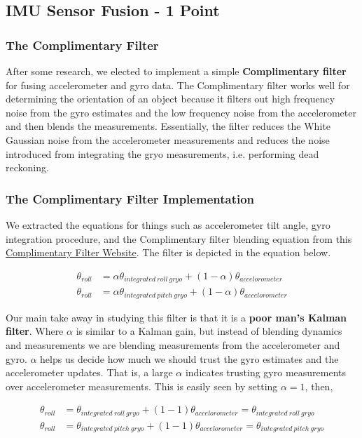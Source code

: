 \documentclass{article}
\numberwithin{equation}{section} %
\numberwithin{figure}{section} %
\numberwithin{table}{section} %
\begin{document}
\begin{framed}
\subsection{IMU Sensor Fusion - 1 Point}
\label{sec:SensorFusion}
\subsubsection{The Complimentary Filter}
After some research, we elected to implement a simple \textbf{Complimentary filter} for fusing accelerometer and gyro data. The Complimentary filter works well for determining the orientation of an object because it filters out high frequency noise from the gyro estimates and the low frequency noise from the accelerometer and then blends the measurements.  Essentially, the filter reduces the White Gaussian noise from the accelerometer measurements and reduces the noise introduced from integrating the gryo measurements, i.e. performing dead reckoning.
\subsubsection{The Complimentary Filter Implementation}

We extracted the equations for things such as accelerometer tilt angle, gyro integration procedure, and the Complimentary filter blending equation from this \href{https://ahrs.readthedocs.io/en/latest/filters/complementary.html}{Complimentary Filter Website}.  The filter is depicted in the equation below.

\begin{align*}
    \theta_{roll} &= \alpha\theta_{integrated \ roll \ gryo } + (1-\alpha)\theta_{accelorometer} \\
    \theta_{roll} &= \alpha\theta_{integrated \ pitch \ gryo } + (1-\alpha)\theta_{accelorometer}
\end{align*}

Our main take away in studying this filter is that it is a \textbf{poor man's Kalman filter}.  Where $\alpha$ is similar to a Kalman gain, but instead of blending dynamics and measurements we are blending measurements from the accelerometer and gyro.  $\alpha$ helps us decide how much we should trust the gyro estimates and the accelerometer updates.  That is, a large $\alpha$ indicates trusting gyro measurements over accelerometer measurements.  This is easily seen by setting $\alpha=1$, then,

\begin{align*}
     \theta_{roll} &= \theta_{integrated \ roll \ gryo } + (1-1)\theta_{accelorometer} = \theta_{integrated \ roll \ gryo } \\
    \theta_{roll} &= \theta_{integrated \ pitch \ gryo } + (1-1)\theta_{accelorometer} = \theta_{integrated \ pitch \ gryo }
\end{align*}


\end{framed}
\end{document}

